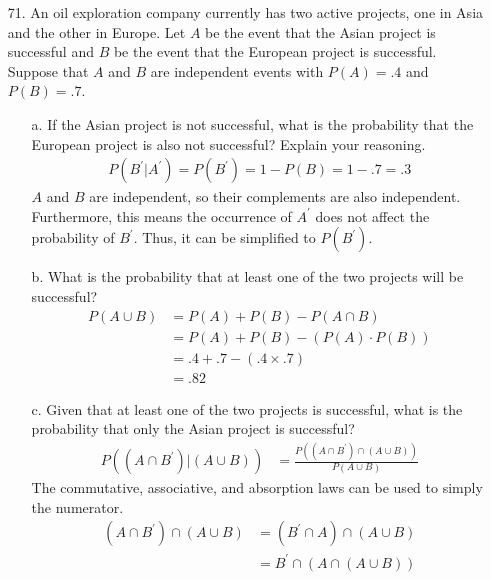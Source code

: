 \documentclass[letterpaper,12pt]{article}
\begin{document}
\maketitle

\begin{enumerate}
  \item[71.]
    An oil exploration company currently has two active projects, one in Asia and the other in Europe. Let $A$ be the event that the Asian project is successful and $B$ be the event that the European project is successful. Suppose that $A$ and $B$ are independent events with $P(A) = .4$ and $P(B) = .7$.
    \begin{enumerate}
      \item[a.]
        If the Asian project is not successful, what is the probability that the European project is also not successful? Explain your reasoning.
        \begin{align*}
          P(B^\prime|A^\prime) = P(B^\prime) = 1 - P(B) = 1 - .7 = .3
        \end{align*}
        $A$ and $B$ are independent, so their complements are also independent. Furthermore, this means the occurrence of $A^\prime$ does not affect the probability of $B^\prime$. Thus, it can be simplified to $P(B^\prime)$.
      \item[b.]
        What is the probability that at least one of the two projects will be successful?
        \begin{align*}
          P(A \cup B) &= P(A) + P(B) - P(A \cap B) \\
          &= P(A) + P(B) - (P(A) \cdot P(B)) \\
          &= .4 + .7 - (.4 \times .7) \\
          &= .82
        \end{align*}
      \item[c.]
        Given that at least one of the two projects is successful, what is the probability that only the Asian project is successful?
        \begin{align*}
          P((A \cap B^\prime)|(A \cup B)) &= \frac{P((A \cap B^\prime) \cap (A \cup B))}{P(A \cup B)}
        \end{align*}
        The commutative, associative, and absorption laws can be used to simply the numerator.
        \begin{align*}
          (A \cap B^\prime) \cap (A \cup B) &= (B^\prime \cap A) \cap (A \cup B) \\
          &= B^\prime \cap (A \cap (A \cup B)) \\

\end{align*}
\end{enumerate}
\end{enumerate}
\end{document}
